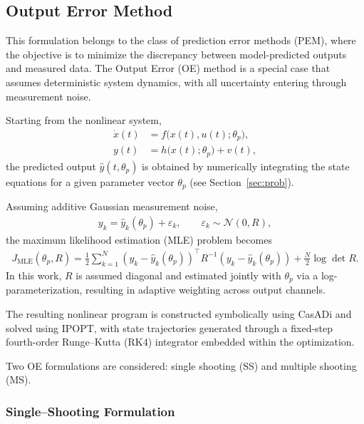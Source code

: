 \documentclass[11pt]{article}
\begin{document}
\subsection{Output Error Method}
This formulation belongs to the class of prediction error methods (PEM), where the objective is to minimize the discrepancy between model-predicted outputs and measured data. The Output Error (OE) method is a special case that assumes deterministic system dynamics, with all uncertainty entering through measurement noise.

Starting from the nonlinear system,
\begin{align}
\dot{x}(t) &= f\big(x(t),u(t);\theta_p\big),\\
y(t) &= h\big(x(t);\theta_p\big) + v(t),
\end{align}
the predicted output $\hat{y}(t,\theta_p)$ is obtained by numerically integrating the state equations for a given parameter vector $\theta_p$ (see Section~\ref{sec:prob}).

Assuming additive Gaussian measurement noise,
\begin{align}
y_k = \hat{y}_k(\theta_p) + \varepsilon_k, \qquad \varepsilon_k \sim \mathcal{N}(0, R),
\end{align}
the maximum likelihood estimation (MLE) problem becomes
\begin{align}
J_{\text{MLE}}(\theta_p, R) =
\frac{1}{2} \sum_{k=1}^{N} 
\left(y_k - \hat{y}_k(\theta_p)\right)^\top R^{-1} 
\left(y_k - \hat{y}_k(\theta_p)\right)
+ \frac{N}{2} \log \det R.
\end{align}
In this work, $R$ is assumed diagonal and estimated jointly with $\theta_p$ via a log-parameterization, resulting in adaptive weighting across output channels.

The resulting nonlinear program is constructed symbolically using CasADi and solved using IPOPT, with state trajectories generated through a fixed-step fourth-order Runge--Kutta (RK4) integrator embedded within the optimization.

Two OE formulations are considered: single shooting (SS) and multiple shooting (MS).

\subsubsection{Single--Shooting Formulation}
\end{document}
